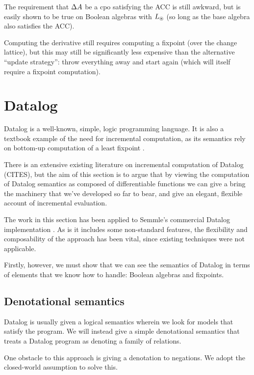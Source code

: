 The requirement that $\Delta A$ be a cpo satisfying the ACC is still awkward, but is easily
shown to be true on Boolean algebras with $L_\circledast$ (so long as the base
algebra also satisfies the ACC).

Computing the derivative still requires computing a fixpoint (over the change
lattice), but this may still be significantly less expensive than the
alternative ``update strategy'': throw everything away and start
again (which will itself require a fixpoint computation).

\section{Datalog}
\label{sec:datalog}

Datalog is a well-known, simple, logic programming language. It is also a textbook
example of the need for incremental computation, as its semantics rely on
bottom-up computation of a least fixpoint \autocite[See][part D]{abiteboul1995foundations}.

There is an extensive existing literature on incremental computation of Datalog
(CITES), but the aim of this section is to argue that by viewing the computation
of Datalog semantics as composed of differentiable functions we can give a
bring the machinery that we've developed so far to bear, and give an elegant,
flexible account of incremental evaluation.

The work in this section has been applied to Semmle's commercial Datalog
implementation \autocites{semmleWebsite}{avgustinov2016ql}{sereni2008adding}{schafer2010type}.
As is it includes some non-standard features, the flexibility and composability
of the approach has been vital, since existing techniques were not applicable.

Firstly, however, we must show that we can see the semantics of Datalog in terms
of elements that we know how to handle: Boolean algebras and fixpoints.

\subsection{Denotational semantics}

Datalog is usually given a logical semantics wherein we look for models that
satisfy the program. We will instead give a simple denotational semantics that treats a Datalog
program as denoting a family of relations.

One obstacle to this approach is giving a denotation to negations. We adopt the
closed-world assumption to solve this.


